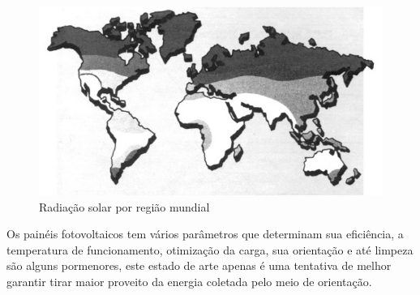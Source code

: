 \begin{figure}[H]
	\centering
	\includegraphics[scale=0.6]{./image/World_Solar_Radiation.jpg}
	\caption{Radiação solar por região mundial \cite{book_2}}
\end{figure}
\newpage
\qquad Os painéis fotovoltaicos tem vários parâmetros que determinam sua eficiência, a temperatura de funcionamento, otimização da carga, sua orientação e até limpeza são alguns pormenores, este estado de arte apenas é uma tentativa de melhor garantir tirar maior proveito da energia coletada pelo meio de orientação.\\
\\
